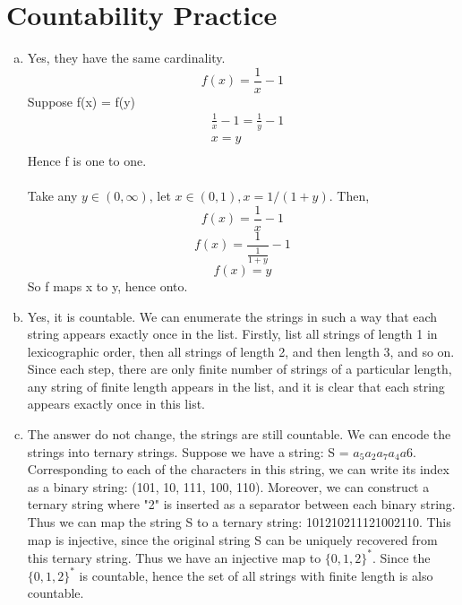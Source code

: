 \documentclass{article}
\begin{document}
\part*{Countability Practice}
    \begin{enumerate}[(a).]
        \item Yes, they have the same cardinality.
        \[f(x) = \frac{1}{x} - 1\]
        Suppose f(x) = f(y)\\
        \begin{align*}
            &\frac{1}{x} - 1 = \frac{1}{y} - 1\\
            &x = y\\
        \end{align*}
        Hence f is one to one.\\
        \\
        Take any $y \in (0, \infty)$, let $x \in (0, 1), x = 1/(1+y)$. Then,
        \[f(x) = \frac{1}{x} - 1 \]
        \[f(x) = \frac{1}{\frac{1}{1+y}} - 1\]
        \[f(x) =  y\]
        So f maps x to y, hence onto.

        \item Yes, it is countable. We can enumerate the strings in 
        such a way that each string appears exactly once in the list. 
        Firstly, list all strings of length 1 in lexicographic order, then 
        all strings of length 2, and then length 3, and so on. Since each step, 
        there are only finite number of strings of a particular length, any string 
        of finite length appears in the list, and it is clear that each string 
        appears exactly once in this list.

        
        \item The answer do not change, the strings are still countable. 
        We can encode the strings into ternary strings. Suppose we have a string: S = $a_5a_2a_7a_4a6$. 
        Corresponding to each of the characters in this string, we can write its index as a binary string: 
        (101, 10, 111, 100, 110). Moreover, we can construct a ternary string where "2" is inserted as a separator 
        between each binary string. Thus we can map the string S to a ternary string: 
        101210211121002110. This map is injective, since the original string S can be 
        uniquely recovered from this ternary string. Thus we have an injective map to $\{0, 1, 2\}^*$. 
        Since the $\{0, 1, 2\}^*$ is countable, hence the set of all strings with finite 
        length is also countable.


    \end{enumerate}    
\end{document}

